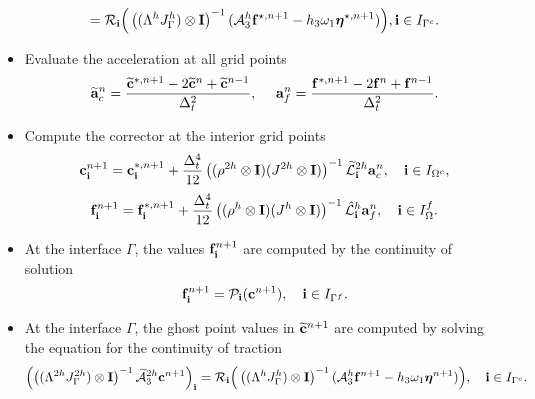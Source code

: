 \begin{breakablealgorithm}
\begin{itemize}
{\begin{equation}
			= {\mathcal{R}}_{\bf i}\Big(\left((\Lambda^hJ_{\Gamma}^h)\otimes{\bf I}\right)^{-1}(\mathcal{A}_3^h{\bf f}^{\star,n+1}-h_3\omega_1{\bm \eta}^{\star,n+1})\Big), {\bf i}\in I_{\Gamma^c}.
			\end{equation}
		}
		\item{Evaluate the acceleration at all grid points 
			\begin{equation*}
			{\widetilde{\bf a}}_c^n= \frac{\widetilde{\bf c}^{*,n+1}-2\widetilde{\bf c}^{n}+\widetilde{\bf c}^{n-1}}{\Delta^2_t},\ \ \ \
			{{\bf a}}_f^{n} = \frac{{\bf f}^{*,n+1}-2{\bf f}^{n}+{\bf f}^{n-1}}{\Delta^2_t}.
			\end{equation*}
		}
		\item{Compute the corrector at the interior grid points
			\[{\bf c}^{n+1}_{\bf i} = {\bf c}^{*,n+1}_{\bf i} + \frac{\Delta_t^4}{12}\left((\rho^{2h}\otimes{\bf I})(J^{2h}\otimes{\bf I})\right)^{-1}\widetilde{\mathcal{L}}^{2h}_{\bf i}{\bf a}_c^{n},\quad {\bf i}\in I_{\Omega^c},\]
			\[{\bf f}^{n+1}_{\bf i} = {\bf f}^{*,n+1}_{\bf i} + \frac{\Delta_t^4}{12}\left((\rho^{h}\otimes{\bf I})(J^h\otimes{\bf I})\right)^{-1}\hat{\mathcal{L}}^{h}_{\bf i}{\bf a}_f^{n},\quad {\bf i}\in I_\Omega^f.\]
		}
		\item{At the interface $\Gamma$, the values ${\bf f}^{n+1}_{\bf i}$  are computed by the continuity of solution
			\begin{equation*}
			{\bf f}^{n+1}_{\bf i} = {\mathcal{P}}_{\bf i}({\bf c}^{n+1}), \quad {\bf i}\in I_{\Gamma^f}.
			\end{equation*}
		}
		\item{At the interface $\Gamma$, the ghost point values in $\widetilde{\bf c}^{n+1}$ are computed by solving the equation for the continuity of traction
			\begin{equation}\label{traction_gamma_corr}
			\left(\left((\Lambda^{2h}J^{2h}_{\Gamma})\otimes{\bf I}\right)^{-1}\wt{\mathcal{A}}_3^{2h}{\bf c}^{n+1}\right)_{\bf i}
			= {\mathcal{R}}_{\bf i}\Big(\left((\Lambda^hJ^h_{\Gamma})\otimes{\bf I}\right)^{-1}(\mathcal{A}_3^h{\bf f}^{n+1}-h_3\omega_1{\bm \eta}^{n+1})\Big), \quad {\bf i}\in I_{\Gamma^c}.
			\end{equation}
		}
	\end{itemize}
\end{breakablealgorithm}
~\\

